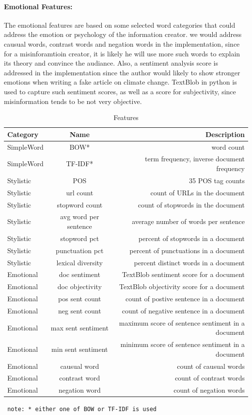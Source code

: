 \documentclass[11pt,a4paper]{article}
\begin{document}
\paragraph{Emotional Features:}
The emotional features are based on some selected word categories that could address the emotion or psychology of the information creator. we would address causual words, contrast words and negation words in the implementation, since for a misinforamtioin creator, it is likely he will use more such words to explain its theory and convince the audiance.
Also, a sentiment analysis score is addressed in the implementation since the author would likely to show stronger emotions when writing a fake article on climate change. TextBlob in python is used to capture such sentiment scores, as well as a score for subjectivity, since misinformation tends to be not very objective.
\begin{table}[h]
  \begin{center}
    \caption{Features}
    \label{tab:table2}
    \begin{tabular}{l|c|r}
      \textbf{Category} & \textbf{Name} & \textbf{Description}\\
      \hline
SimpleWord & BOW* & word count\\
SimpleWord & TF-IDF* & term frequency, inverse document frequency\\
Stylistic & POS & 35 POS tag counts \\
Stylistic & url count & count of URLs in the document\\
Stylistic & stopword count & count of stopwords in the document\\
Stylistic & avg word per sentence & average number of words per sentence\\
Stylistic & stopword pct & percent of stopwords in a document\\
Stylistic & punctuation pct & percent of punctuations in a document\\
Stylistic & lexical diversity & percent distinct words in a document\\
Emotional & doc sentiment & TextBlob sentiment score for a document\\
Emotional & doc objectivity & TextBlob objectivity score for a document\\
Emotional & pos sent count & count of postive sentence in a document\\
Emotional & neg sent count & count of negative sentence in a document\\
Emotional & max sent sentiment & maximum score of sentence sentiment in a document\\
Emotional & min sent sentiment & minimum score of sentence sentiment in a document\\
Emotional & causual word & count of causual words\\
Emotional & contrast word & count of contrast words\\
Emotional & negation word & count of negation words\\
    \end{tabular}
    \texttt{ note: * either one of BOW or TF-IDF is used}
  \end{center}
\end{table}
\end{document}
